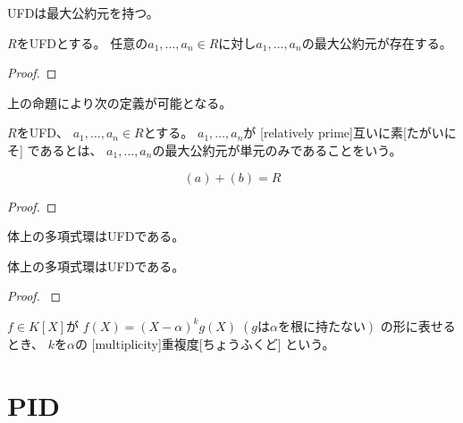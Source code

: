 \documentclass[report]{jlreq}
\begin{document}
UFDは最大公約元を持つ。

\begin{proposition}[UFDは最大公約元を持つ]
    $R$をUFDとする。
    任意の$a_1, \dots, a_n \in R$に対し$a_1, \dots, a_n$の最大公約元が存在する。
\end{proposition}

\begin{proof}
\end{proof}

上の命題により次の定義が可能となる。

\begin{definition}[互いに素]
    $R$をUFD、
    $a_1, \dots, a_n \in R$とする。
    $a_1, \dots, a_n$が
    [relatively prime]{互いに素}[たがいにそ]
    であるとは、
    $a_1, \dots, a_n$の最大公約元が単元のみであることをいう。
\end{definition}

\begin{proposition}[互いに素な元と互いに素なイデアル]
    \begin{equation}
        (a) + (b) = R
    \end{equation}
    \TODO{}
\end{proposition}

\begin{proof}
\end{proof}

体上の多項式環はUFDである。

\begin{theorem}
    体上の多項式環はUFDである。
\end{theorem}

\begin{proof}
    \cite[p.111]{Rot15}
\end{proof}

\begin{definition}[重複度]
    $f \in K[X]$が
    $f(X) = (X - \alpha)^k g(X) \;
        (\text{$g$は$\alpha$を根に持たない})$
    の形に表せるとき、
    $k$を$\alpha$の
    [multiplicity]{重複度}[ちょうふくど]
    という。
\end{definition}

%
\section{PID}
\end{document}
